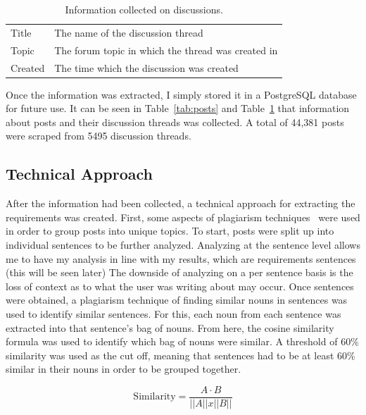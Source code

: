 \documentclass[conference]{IEEEtran}
\begin{document}
\begin{table}[h]
\begin{center}
\begin{tabular}{| l | p{6cm} |}
\hline
Title & The name of the discussion thread \\
Topic & The forum topic in which the thread was created in \\
Created & The time which the discussion was created \\
\hline
\end{tabular}
\end{center}
\caption{Information collected on discussions.\label{tab:discussions}}
\end{table}

Once the information was extracted, I simply stored it in a PostgreSQL database for future use. It can
be seen in Table~\ref{tab:posts} and Table~\ref{tab:discussions} that information about posts and their
discussion threads was collected. A total of 44,381 posts were scraped from 5495 discussion threads.

\subsection{Technical Approach}

After the information had been collected, a technical approach for extracting the requirements was created.
First, some aspects of plagiarism techniques~\cite{Leung:2007:NLP} were used in order to group posts into unique topics. To start,
posts were split up into individual sentences to be further analyzed. Analyzing at the sentence level allows
me to have my analysis in line with my results, which are requirements sentences (this will be seen later) The
downside of analyzing on a per sentence basis is the loss of context as to what the user was writing about
may occur. Once sentences were obtained, a plagiarism technique of finding similar nouns in sentences was
used to identify similar sentences. For this, each noun from each sentence was extracted into that sentence's
bag of nouns. From here, the cosine similarity formula was used to identify which bag of nouns were similar.
A threshold of 60\% similarity was used as the cut off, meaning that sentences had to be at least 60\% similar
in their nouns in order to be grouped together.

\begin{equation}
\text{Similarity} = \frac{ A \cdot B }{||A|| x ||B||}
\end{equation}
\end{document}
